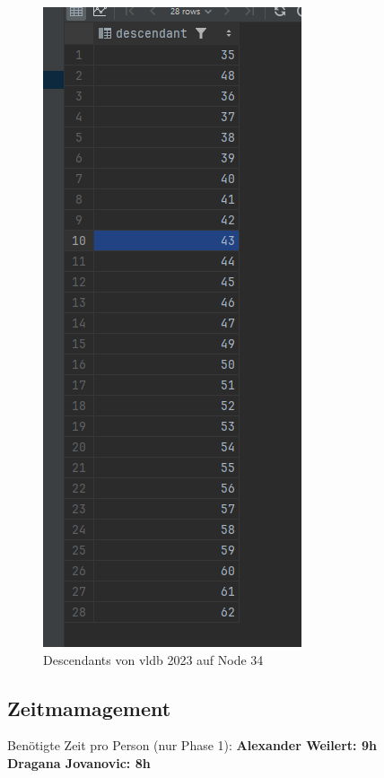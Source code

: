 \documentclass[11pt]{scrartcl}
\begin{document}
\begin{figure}[H]
\begin{minipage}[b]{.4\linewidth}
\begin{center}
            \includegraphics[width=\linewidth]{img_3.png}
            \caption{Descendants von vldb 2023 auf Node 34}
        \end{center}
    \end{minipage}
\end{figure}

\subsection*{Zeitmamagement}

Benötigte Zeit pro Person (nur Phase 1):
\textbf{Alexander Weilert: 9h} \\
\textbf{Dragana Jovanovic: 8h}
\end{document}

